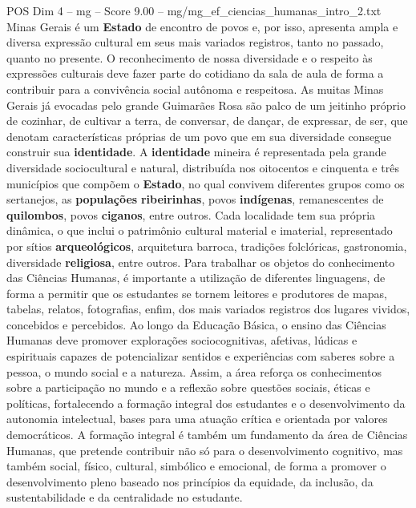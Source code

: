 \begin{textsample}{POS Dim 4 – mg – Score 9.00 – mg/mg\_ef\_ciencias\_humanas\_intro\_2.txt}  \label{ex:f4_pos_200}
Minas Gerais é um \textbf{Estado} de encontro de povos e, por isso, apresenta ampla e diversa expressão cultural em seus mais variados registros, tanto no passado, quanto no presente.
O reconhecimento de nossa diversidade e o respeito às expressões culturais deve fazer parte do cotidiano da sala de aula de forma a contribuir para a convivência social autônoma e respeitosa.
As muitas Minas Gerais já evocadas pelo grande Guimarães Rosa são palco de um jeitinho próprio de cozinhar, de cultivar a terra, de conversar, de dançar, de expressar, de ser, que denotam características próprias de um povo que em sua diversidade consegue construir sua \textbf{identidade}.
A \textbf{identidade} mineira é representada pela grande diversidade sociocultural e natural, distribuída nos oitocentos e cinquenta e três municípios que compõem o \textbf{Estado}, no qual convivem diferentes grupos como os sertanejos, as \textbf{populações} \textbf{ribeirinhas}, povos \textbf{indígenas}, remanescentes de \textbf{quilombos}, povos \textbf{ciganos}, entre outros.
Cada localidade tem sua própria dinâmica, o que inclui o patrimônio cultural material e imaterial, representado por sítios \textbf{arqueológicos}, arquitetura barroca, tradições folclóricas, gastronomia, diversidade \textbf{religiosa}, entre outros.
Para trabalhar os objetos do conhecimento das Ciências Humanas, é importante a utilização de diferentes linguagens, de forma a permitir que os estudantes se tornem leitores e produtores de mapas, tabelas, relatos, fotografias, enfim, dos mais variados registros dos lugares vividos, concebidos e percebidos.
Ao longo da Educação Básica, o ensino das Ciências Humanas deve promover explorações sociocognitivas, afetivas, lúdicas e espirituais capazes de potencializar sentidos e experiências com saberes sobre a pessoa, o mundo social e a natureza.
Assim, a área reforça os conhecimentos sobre a participação no mundo e a reflexão sobre questões sociais, éticas e políticas, fortalecendo a formação integral dos estudantes e o desenvolvimento da autonomia intelectual, bases para uma atuação crítica e orientada por valores democráticos.
A formação integral é também um fundamento da área de Ciências Humanas, que pretende contribuir não só para o desenvolvimento cognitivo, mas também social, físico, cultural, simbólico e emocional, de forma a promover o desenvolvimento pleno baseado nos princípios da equidade, da inclusão, da sustentabilidade e da centralidade no estudante.

\end{textsample}
